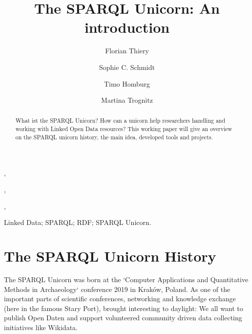 \documentclass[twocolumn]{autart}
\begin{document}
\begin{frontmatter}

\title{The SPARQL Unicorn: An introduction}
                                               

\author[FT]{Florian Thiery},
\author[SCS]{Sophie C. Schmidt},
\author[TH]{Timo Homburg},
\author[MT]{Martina Trognitz}

\address[FT]{ORCID: 0000-0002-3246-3531, Research Squirrel Engineers}
\address[SCS]{ORCID: 0000-0003-4696-2101, Research Squirrel Engineers}
\address[TH]{ORCID: 0000-0002-9499-5840, Research Squirrel Engineers}
\address[MT]{ORCID: 0000-0003-0485-6861, Research Squirrel Engineers}

          
\begin{keyword}                             
Linked Data; SPARQL; RDF; SPARQL Unicorn.
\end{keyword}

\begin{abstract}                         

What ist the SPARQL Unicorn? How can a unicorn help researchers handling and working with Linked Open Data resources? This working paper will give an overview on the SPARQL unicorn history, the main idea, developed tools and projects.

\end{abstract}

\end{frontmatter}

\section{The SPARQL Unicorn History}

The SPARQL Unicorn was born at the `Computer Applications and Quantitative Methods in Archaeology` conference 2019 in Kraków, Poland. As one of the important parts of scientific conferences, networking and knowledge exchange (here in the famous Stary Port), brought interesting to daylight: We all want to publish Open Daten and support volunteered community driven data collecting initiatives like Wikidata. 
\end{document}
